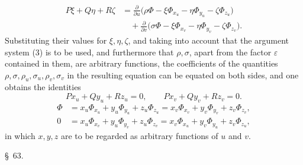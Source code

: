 \documentclass[11pt,a4paper,leqno]{article}
\begin{document}
\[
\begin{aligned}
P\xi+Q\eta+R\zeta
&=\frac{\partial}{\partial u}
\bigl(\rho\Phi-\xi\Phi_{x_u}-\eta\Phi_{y_u}-\zeta\Phi_{z_u}\bigr)\\
&\quad+\frac{\partial}{\partial v}
\bigl(\sigma\Phi-\xi\Phi_{x_v}-\eta\Phi_{y_v}-\zeta\Phi_{z_v}\bigr).
\end{aligned}
\]
Substituting their values for $\xi,\eta,\zeta$, and taking into account that the argument system (3) is to be used, and furthermore that $\rho,\sigma$, apart from the factor $\varepsilon$ contained in them, are arbitrary functions, the coefficients of the quantities $\rho,\sigma,\rho_u,\sigma_u,\rho_v,\sigma_v$ in the resulting equation can be equated on both sides, and one obtains the identities
\begin{equation}\tag{4}
Px_u+Qy_u+Rz_u=0,
\qquad
Px_v+Qy_v+Rz_v=0.
\end{equation}
\begin{equation}\tag{5}
\begin{aligned}
\Phi
&=x_u\Phi_{x_u}+y_u\Phi_{y_u}+z_u\Phi_{z_u}
=x_v\Phi_{x_v}+y_v\Phi_{y_v}+z_v\Phi_{z_v},\\
0
&=x_u\Phi_{x_v}+y_u\Phi_{y_v}+z_u\Phi_{z_v}
=x_v\Phi_{x_u}+y_v\Phi_{y_u}+z_v\Phi_{z_u},
\end{aligned}
\end{equation}
in which $x,y,z$ are to be regarded as arbitrary functions of $u$ and $v$.


\begin{center}
{\large \S~63.}
\end{center}
\end{document}
